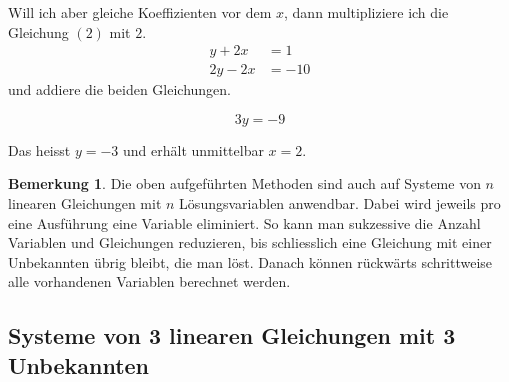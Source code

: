 \documentclass[%
11pt,%
twoside,%
titlepage,%
swissgerman,%
headsepline%
]{scrartcl}
\theoremstyle{definition}
\newtheorem{bem}{Bemerkung}[subsection] %
\theoremstyle{plain}
\begin{document}
Will ich aber gleiche Koeffizienten vor dem $x$, dann multipliziere ich die Gleichung $(2)$ mit $2$.
\begin{align}
y+2x&=1\tag{1}\\
2y-2x&=-10\tag{$2\cdot(2)$}
\end{align}
und addiere die beiden Gleichungen.

\begin{equation}
3y=-9\tag{$1)+(2$}
\end{equation}

Das heisst $y=-3$ und erhält unmittelbar $x=2$.

\begin{bem}
Die oben aufgeführten Methoden sind auch auf Systeme von $n$ linearen Gleichungen mit $n$ Lösungsvariablen anwendbar. Dabei wird jeweils pro eine Ausführung eine Variable eliminiert. So kann man sukzessive die Anzahl Variablen und Gleichungen reduzieren, bis schliesslich eine Gleichung mit einer Unbekannten übrig bleibt, die man löst. Danach können rückwärts schrittweise alle vorhandenen Variablen berechnet werden.
\end{bem}

\subsection{Systeme von 3 linearen Gleichungen mit 3 Unbekannten}
\end{document}
